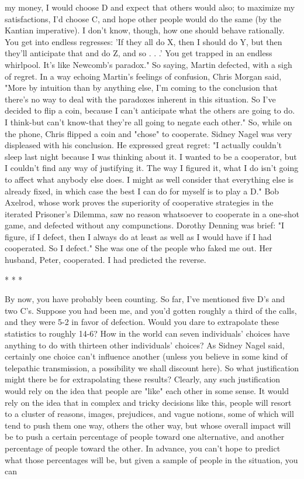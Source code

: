 my money, I would choose D and expect that others would also; to maximize my
satisfactions, I'd choose C, and hope other people would do the same (by the Kantian
imperative). I don't know, though, how one should behave rationally. You get into
endless regresses: 'If they all do X, then I should do Y, but then they'll anticipate that
and do Z, and so . . .' You get trapped in an endless whirlpool. It's like Newcomb's
paradox." So saying, Martin defected, with a sigh of regret.
        In a way echoing Martin's feelings of confusion, Chris Morgan said, "More by
intuition than by anything else, I'm coming to the conclusion that there's no way to
deal with the paradoxes inherent in this situation. So I've decided to flip a coin,
because I can't anticipate what the others are going to do. I think-but can't know-that
they're all going to negate each other." So, while on the phone, Chris flipped a coin
and "chose" to cooperate.
        Sidney Nagel was very displeased with his conclusion. He expressed great
regret: "I actually couldn't sleep last night because I was thinking about it. I wanted to
be a cooperator, but I couldn't find any way of justifying it. The way I figured it, what
I do isn't going to affect what anybody else does. I might as well consider that
everything else is already fixed, in which case the best I can do for myself is to play a
D."
        Bob Axelrod, whose work proves the superiority of cooperative strategies in
the iterated Prisoner's Dilemma, saw no reason whatsoever to cooperate in a one-shot
game, and defected without any compunctions.
        Dorothy Denning was brief: "I figure, if I defect, then I always do at least as
well as I would have if I had cooperated. So I defect." She was one of the people who
faked me out. Her husband, Peter, cooperated. I had predicted the reverse.

                                        *   *   *

        By now, you have probably been counting. So far, I've mentioned five D's and
two C's. Suppose you had been me, and you'd gotten roughly a third of the calls, and
they were 5-2 in favor of defection. Would you dare to extrapolate these statistics to
roughly 14-6? How in the world can seven individuals' choices have anything to do
with thirteen other individuals' choices? As Sidney Nagel said, certainly one choice
can't influence another (unless you believe in some kind of telepathic transmission, a
possibility we shall discount here). So what justification might there be for
extrapolating these results?
        Clearly, any such justification would rely on the idea that people are "like"
each other in some sense. It would rely on the idea that in complex and tricky
decisions like this, people will resort to a cluster of reasons, images, prejudices, and
vague notions, some of which will tend to push them one way, others the other way,
but whose overall impact will be to push a certain percentage of people toward one
alternative, and another percentage of people toward the other. In advance, you can't
hope to predict what those percentages will be, but given a sample of people in the
situation, you can




